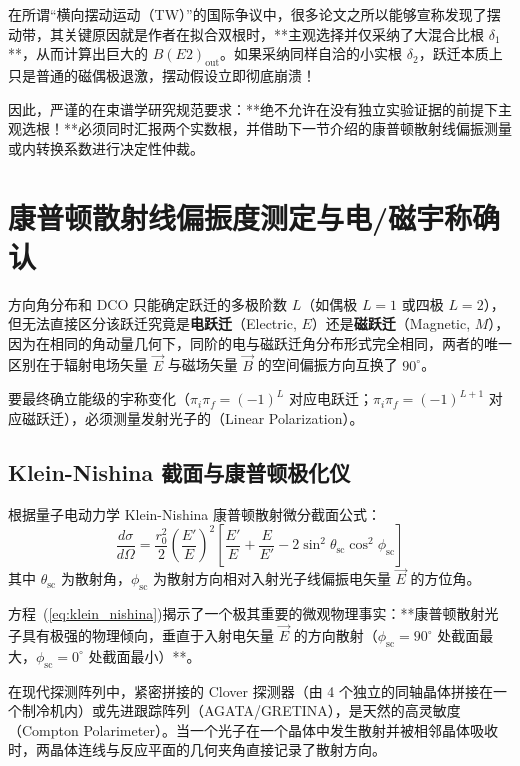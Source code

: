 在所谓“横向摆动运动（TW）”的国际争议中，很多论文之所以能够宣称发现了摆动带，其关键原因就是作者在拟合双根时，**主观选择并仅采纳了大混合比根 $\delta_1$**，从而计算出巨大的 $B(E2)_{\text{out}}$。如果采纳同样自洽的小实根 $\delta_2$，跃迁本质上只是普通的磁偶极退激，摆动假设立即彻底崩溃！

因此，严谨的在束谱学研究规范要求：**绝不允许在没有独立实验证据的前提下主观选根！**必须同时汇报两个实数根，并借助下一节介绍的康普顿散射线偏振测量或内转换系数进行决定性仲裁。

\section{康普顿散射线偏振度测定与电/磁宇称确认}
\label{sec:linear_polarization}

方向角分布和 DCO 只能确定跃迁的多极阶数 $L$（如偶极 $L=1$ 或四极 $L=2$），但无法直接区分该跃迁究竟是\textbf{电跃迁}（Electric, $E$）还是\textbf{磁跃迁}（Magnetic, $M$），因为在相同的角动量几何下，同阶的电与磁跃迁角分布形式完全相同，两者的唯一区别在于辐射电场矢量 $\vec{E}$ 与磁场矢量 $\vec{B}$ 的空间偏振方向互换了 $90^\circ$。

要最终确立能级的宇称变化（$\pi_i \pi_f = (-1)^L$ 对应电跃迁；$\pi_i \pi_f = (-1)^{L+1}$ 对应磁跃迁），必须测量发射光子的（Linear Polarization）。

\subsection{Klein-Nishina 截面与康普顿极化仪}

根据量子电动力学 Klein-Nishina 康普顿散射微分截面公式：
\begin{equation}
    \frac{d\sigma}{d\Omega} = \frac{r_0^2}{2} \left( \frac{E'}{E} \right)^2 \left[ \frac{E'}{E} + \frac{E}{E'} - 2 \sin^2\theta_{\text{sc}} \cos^2\phi_{\text{sc}} \right]
    \label{eq:klein_nishina}
\end{equation}
其中 $\theta_{\text{sc}}$ 为散射角，$\phi_{\text{sc}}$ 为散射方向相对入射光子线偏振电矢量 $\vec{E}$ 的方位角。

方程~(\ref{eq:klein_nishina})揭示了一个极其重要的微观物理事实：**康普顿散射光子具有极强的物理倾向，垂直于入射电矢量 $\vec{E}$ 的方向散射（$\phi_{\text{sc}} = 90^\circ$ 处截面最大，$\phi_{\text{sc}} = 0^\circ$ 处截面最小）**。

在现代探测阵列中，紧密拼接的 Clover 探测器（由 4 个独立的同轴晶体拼接在一个制冷机内）或先进跟踪阵列（AGATA/GRETINA），是天然的高灵敏度（Compton Polarimeter）。当一个光子在一个晶体中发生散射并被相邻晶体吸收时，两晶体连线与反应平面的几何夹角直接记录了散射方向。

